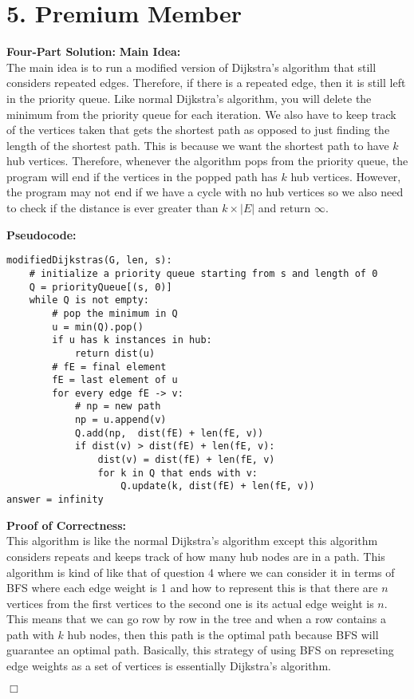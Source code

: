 \documentclass[11pt]{article}
\def\endproofmark{$\Box$}
\newenvironment{FourPartSolution}{\par{\bf Four-Part Solution:}}{\smallskip}
\newenvironment{mainIdea}{{\bf Main Idea:}}{\smallskip}
\newenvironment{pseudocode}{\par{\bf Pseudocode:}}{\smallskip}
\newenvironment{proofOfCorrectness}{\par{\bf Proof of Correctness:}}{\endproofmark\smallskip}
\begin{document}
\section*{5. Premium Member}
\begin{FourPartSolution}
\begin{mainIdea}
\\
The main idea is to run a modified version of Dijkstra's algorithm that still considers repeated edges. Therefore, if there is a repeated edge, then it is still left in the priority queue. Like normal Dijkstra's algorithm, you will delete the minimum from the priority queue for each iteration. We also have to keep track of the vertices taken that gets the shortest path as opposed to just finding the length of the shortest path. This is because we want the shortest path to have $k$ hub vertices. Therefore, whenever the algorithm pops from the priority queue, the program will end if the vertices in the popped path has $k$ hub vertices. However, the program may not end if we have a cycle with no hub vertices so we also need to check if the distance is ever greater than $k \times |E|$ and return $\infty$.
\end{mainIdea}
\\
\begin{pseudocode}
\begin{lstlisting}
modifiedDijkstras(G, len, s):
	# initialize a priority queue starting from s and length of 0
	Q = priorityQueue[(s, 0)]
	while Q is not empty:
		# pop the minimum in Q
		u = min(Q).pop()
		if u has k instances in hub:
			return dist(u)
		# fE = final element
		fE = last element of u
		for every edge fE -> v:
			# np = new path
			np = u.append(v)
			Q.add(np,  dist(fE) + len(fE, v))
			if dist(v) > dist(fE) + len(fE, v):
				dist(v) = dist(fE) + len(fE, v)
				for k in Q that ends with v:
					Q.update(k, dist(fE) + len(fE, v))
answer = infinity
\end{lstlisting}
\end{pseudocode}
\begin{proofOfCorrectness}
\\
This algorithm is like the normal Dijkstra's algorithm except this algorithm considers repeats and keeps track of how many hub nodes are in a path. This algorithm is kind of like that of question 4 where we can consider it in terms of BFS where each edge weight is 1 and how to represent this is that there are $n$ vertices from the first vertices to the second one is its actual edge weight is $n$. This means that we can go row by row in the tree and when a row contains a path with $k$ hub nodes, then this path is the optimal path because BFS will guarantee an optimal path. Basically, this strategy of using BFS on represeting edge weights as a set of vertices is essentially Dijkstra's algorithm.

\end{proofOfCorrectness}
\end{FourPartSolution}
\end{document}
